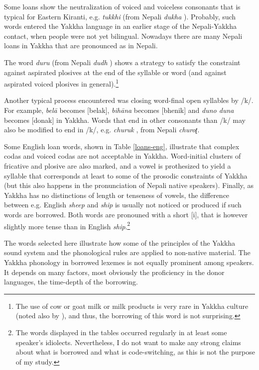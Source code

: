 Some loans show the neutralization of voiced and voiceless consonants that is typical for Eastern Kiranti, e.g. \emph{tukkhi} (from Nepali \emph{dukha} ). Probably, such  words entered the Yakkha language in an earlier stage of the Nepali-Yakkha contact, when people were not yet bilingual. Nowadays there are many Nepali loans in Yakkha that are pronounced as in Nepali. 
 
 The word \emph{duru} (from Nepali \emph{dudh} ) shows a strategy to satisfy the constraint against aspirated plosives at the end of the syllable or word (and against aspirated voiced plosives in general).\footnote{The use of cow or goat milk or milk products is very rare in Yakkha culture (noted also by \citealt[128-30]{Russell1992_Yakha}), and thus, the borrowing of this word is not surprising.} 
 
 Another typical process  encountered was closing word-final open syllables by /k/. For example, \emph{belā}   becomes [belak], \emph{bihāna}   becomes [bhenik] and \emph{duno \ti duna}  becomes [donak] in Yakkha. Words that end in other consonants than /k/ may also be modified to end in /k/, e.g. \emph{churuk} , from Nepali \emph{churoʈ}.

Some English loan words, shown in Table \ref{loans-eng}, illustrate that complex codas and voiced codas are not acceptable in Yakkha. Word-initial clusters of fricative and plosive are also marked, and a vowel is prothesized to yield a syllable that corresponds at least to some of  the prosodic constraints of Yakkha (but this also happens in the pronunciation of Nepali native speakers). Finally, as Yakkha has no distinctions of length or tenseness of vowels, the difference between e.g. English \emph{sheep} and \emph{ship} is usually not noticed or produced if such words are borrowed. Both words are pronouned with a short [i], that is however slightly more tense than in English \emph{ship}.\footnote{The words displayed in the tables occurred regularly in at least some speaker's idiolects. Nevertheless, I do not want to make any strong claims about what is borrowed and what is  code-switching, as this is not the purpose of my study.} 

The words selected here illustrate how some of the principles of the Yakkha sound system and the phonological rules are applied to non-native material. The Yakkha phonology in borrowed lexemes is not equally prominent among speakers. It depends on many factors, most obviously the proficiency in the donor languages, the time-depth of the borrowing.



